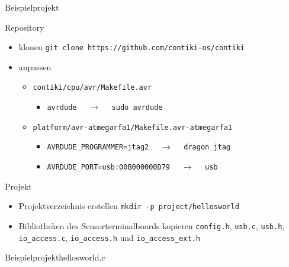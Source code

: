 \begin{frame}{Beispielprojekt}
	\begin{block}{Repository}
		\begin{itemize}
		\item	klonen\newline
			\texttt{git clone https://github.com/contiki-os/contiki}
		\item	anpassen
			\begin{itemize}
			\item	\texttt{contiki/cpu/avr/Makefile.avr}
				\begin{itemize}
				\item	\texttt{avrdude}
					\(\quad\to\quad\)
					\texttt{sudo avrdude}
				\end{itemize}
			\item	\texttt{platform/avr-atmegarfa1/Makefile.avr-atmegarfa1}
				\begin{itemize}
				\item	\texttt{AVRDUDE\_PROGRAMMER=jtag2}
					\(\quad\to\quad\)
					\texttt{dragon\_jtag}
				\item	\texttt{AVRDUDE\_PORT=usb:00B000000D79}
					\(\quad\to\quad\)
					\texttt{usb}
				\end{itemize}
			\end{itemize}
		\end{itemize}
	\end{block}
	\begin{block}{Projekt}
		\begin{itemize}
		\item	Projektverzeichnis erstellen\newline
			\texttt{mkdir -p project/hellosworld}
		\item	Bibliotheken des Sensorterminalboards kopieren\newline
			\texttt{config.h}, \quad
			\texttt{usb.c}, \quad
			\texttt{usb.h}, \quad
			\texttt{io\_access.c}, \quad
			\texttt{io\_access.h} \quad und \quad
			\texttt{io\_access\_ext.h} \quad
		\end{itemize}
	\end{block}
\end{frame}

\begin{frame}{Beispielprojekt}{hellosworld.c}
	
\end{frame}

